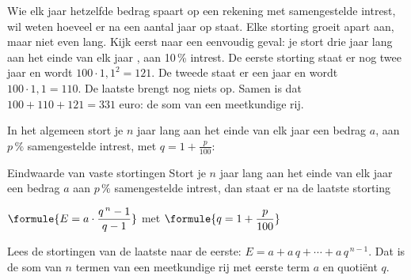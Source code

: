 Wie elk jaar hetzelfde bedrag spaart op een rekening met samengestelde intrest, wil weten hoeveel er na een aantal jaar op staat. Elke storting groeit apart aan, maar niet even lang. Kijk eerst naar een eenvoudig geval: je stort drie jaar lang aan het einde van elk jaar , aan 10\,\% intrest. De eerste storting staat er nog twee jaar en wordt $100 \cdot 1{,}1^2 = 121$. De tweede staat er een jaar en wordt $100 \cdot 1{,}1 = 110$. De laatste brengt nog niets op. Samen is dat $100 + 110 + 121 = 331$ euro: de som van een meetkundige rij.

In het algemeen stort je $n$ jaar lang aan het einde van elk jaar een bedrag $a$, aan $p\,\%$ samengestelde intrest, met $q = 1 + \tfrac{p}{100}$:

\vspace{2mm}

\begin{theorie}
\begin{stelling}{Eindwaarde van vaste stortingen}
Stort je $n$ jaar lang aan het einde van elk jaar een bedrag $a$ aan $p\,\%$ samengestelde intrest, dan staat er na de laatste storting

\vspace{1mm}
\qquad $\formule{E = a \cdot \dfrac{q^{\,n} - 1}{q - 1}}$ \quad met $\formule{q = 1 + \dfrac{p}{100}}$
\end{stelling}

\begin{bewijs}
Lees de stortingen van de laatste naar de eerste: $E = a + a\,q + \cdots + a\,q^{\,n-1}$. Dat is de som van $n$ termen van een meetkundige rij met eerste term $a$ en quotiënt $q$.
\end{bewijs}
\end{theorie}

